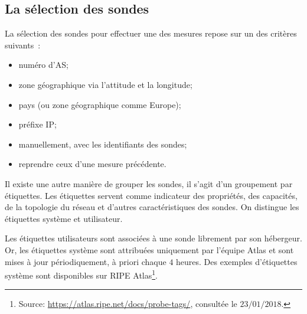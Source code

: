 \subsection{La sélection des sondes}
La sélection des sondes   pour effectuer une des mesures repose sur un des critères suivants~: 
\begin{itemize}
	\item numéro d'AS;
	\item zone géographique via  l'attitude et la longitude;
	\item pays (ou zone géographique comme  Europe);
	\item préfixe IP; %
	\item manuellement, avec les identifiants des sondes;
	\item reprendre ceux d'une  mesure précédente.
\end{itemize}

Il existe une autre manière de grouper les sondes, il s'agit d'un groupement  par étiquettes.  Les étiquettes servent comme indicateur des propriétés, des capacités, de la topologie du réseau et d'autres caractéristiques des sondes. On distingue les étiquettes système  et utilisateur. %

Les étiquettes utilisateurs sont  associées à une sonde librement par son hébergeur. Or, les étiquettes système sont attribuées uniquement par l'équipe  Atlas et sont mises à jour périodiquement, à priori chaque $4$ heures. Des exemples d'étiquettes système sont disponibles sur RIPE Atlas\footnote{Source: \url{https://atlas.ripe.net/docs/probe-tags/}, consultée le $23/01/2018$.}.


